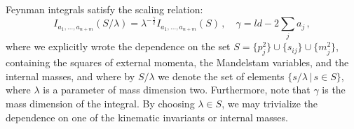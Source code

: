 \documentclass{article}
\begin{document}
Feynman integrals satisfy the scaling relation:
\begin{equation}
\label{eq:eqnscaling}
I_{a_1, \ldots, a_{n+m}}(S/\lambda)=\lambda^{-\frac{\gamma}{2}} I_{a_1, \ldots, a_{n+m}}(S)\,,\quad \gamma=ld-2\sum_j a_j\,,
\end{equation}
where we explicitly wrote the dependence on the set $S = \{p_{j}^2\} \cup \{s_{ij}\} \cup \{m_j^2\}$, containing the squares of external momenta, the Mandelstam variables, and the internal masses, and where by $S/\lambda$ we denote the set of elements $\{s/\lambda\,|\, s \in S\}$, where $\lambda$ is a parameter of mass dimension two. Furthermore, note that $\gamma$ is the mass dimension of the integral. By choosing $\lambda\in S$, we may trivialize the dependence on one of the kinematic invariants or internal masses.
\end{document}
